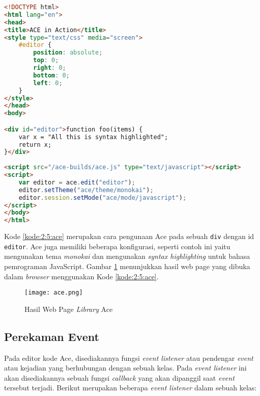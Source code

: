 \begin{lstlisting}[language={html}, caption={Contoh kode pengunaan Ace}, label={kode:2:5:ace}]
<!DOCTYPE html>
<html lang="en">
<head>
<title>ACE in Action</title>
<style type="text/css" media="screen">
	#editor { 
		position: absolute;
		top: 0;
		right: 0;
		bottom: 0;
		left: 0;
	}
</style>
</head>
<body>

<div id="editor">function foo(items) {
	var x = "All this is syntax highlighted";
	return x;
}</div>
	
<script src="/ace-builds/ace.js" type="text/javascript"></script>
<script>
	var editor = ace.edit("editor");
	editor.setTheme("ace/theme/monokai");
	editor.session.setMode("ace/mode/javascript");
</script>
</body>
</html>
\end{lstlisting}

Kode \ref{kode:2:5:ace} merupakan cara pengunaan Ace pada sebuah \texttt{div} dengan id \texttt{editor}. Ace juga memiliki beberapa konfigurasi, seperti contoh ini yaitu mengunakan tema \textit{monokai} dan mengunakan \textit{syntax highlighting} untuk bahasa pemrograman JavaScript. Gambar \ref{fig:2:5:ace} menunjukkan hasil web page yang dibuka dalam \textit{browser} menggunakan Kode \ref{kode:2:5:ace}.

\begin{figure}[H]
	\centering
	\texttt{[image: ace.png]}
	\caption{Hasil Web Page \textit{Library} Ace}
	\label{fig:2:5:ace}
\end{figure}

\subsection{Perekaman Event}

Pada editor kode Ace, disediakannya fungsi \textit{event listener} atau pendengar \textit{event} atau kejadian yang berhubungan dengan sebuah kelas. Pada \textit{event listener} ini akan disediakannya sebuah fungsi \textit{callback} yang akan dipanggil saat \textit{event} tersebut terjadi. Berikut merupakan beberapa \textit{event listener} dalam sebuah kelas:

